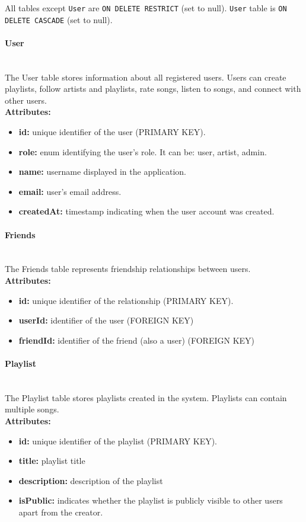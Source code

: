 \documentclass[11pt, a4paper]{article}
\begin{document}
All tables except \texttt{User} are \texttt{ON DELETE RESTRICT} (set to null). \texttt{User} table is \texttt{ON DELETE CASCADE} (set to null).

\paragraph{User}~\\
The User table stores information about all registered users. Users can create playlists, follow artists and playlists, rate songs, listen to songs, and connect with other users.
~\\\textbf{Attributes:}
\begin{itemize}
    \item \textbf{id:} unique identifier of the user (PRIMARY KEY).
    \item \textbf{role:} enum identifying the user's role. It can be: user, artist, admin.
    \item \textbf{name:} username displayed in the application.
    \item \textbf{email:} user's email address.
    \item \textbf{createdAt:} timestamp indicating when the user account was created.
\end{itemize}

\paragraph{Friends}~\\
The Friends table represents friendship relationships between users.
~\\\textbf{Attributes:}
\begin{itemize}
    \item \textbf{id:} unique identifier of the relationship (PRIMARY KEY).
    \item \textbf{userId:} identifier of the user (FOREIGN KEY)
    \item \textbf{friendId:} identifier of the friend (also a user) (FOREIGN KEY)
\end{itemize}

\paragraph{Playlist}~\\
The Playlist table stores playlists created in the system. Playlists can contain multiple songs.
~\\\textbf{Attributes:}
\begin{itemize}
    \item \textbf{id:} unique identifier of the playlist (PRIMARY KEY).
    \item \textbf{title:} playlist title
    \item \textbf{description:} description of the playlist
    \item \textbf{isPublic:} indicates whether the playlist is publicly visible to other users apart from the creator.
\end{itemize}
\end{document}

